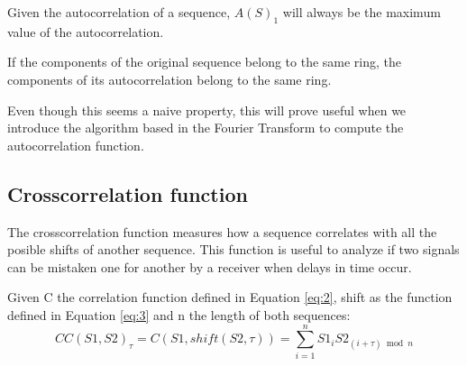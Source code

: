 \begin{corollary}\label{autocorrelation:coro:1}
  Given the autocorrelation of a sequence, $A(S)_{1}$ will always be the
  maximum value of the autocorrelation.
\end{corollary}

\begin{property}\label{autocorrelation:prop:1}

  If the components of the original sequence belong to the same ring, the
  components of its autocorrelation belong to the same ring.

\end{property}

Even though this seems a naive property, this will prove
useful when we introduce the algorithm based in the Fourier Transform to
compute the autocorrelation function.









\subsection{Crosscorrelation function}

The crosscorrelation function measures how a sequence correlates with all
the posible shifts of another sequence. This function is useful to analyze if two
signals can be mistaken one for another by a receiver when delays in time occur.


\begin{definition}[Crosscorrelation]\label{def:4}
  Given C the correlation function defined in Equation \eqref{eq:2}, shift as the function defined in Equation \eqref{eq:3} and n the length of both sequences:
  \begin{equation}\label{eq:7}
    CC(S1, S2)_{\tau} = C(S1, shift(S2, \tau)) = \sum_{i=1}^{n}S1_{i}S2_{(i+\tau) \bmod n}
  \end{equation}
\end{definition}

